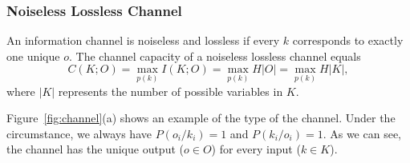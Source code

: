 \subsubsection{Noiseless Lossless Channel}
An information channel is noiseless and lossless if every $k$ corresponds to exactly one unique $o$. The channel capacity of a noiseless lossless channel equals
\begin{equation} \label{chapter5:eq4}
  C(K;O) = \max_{p(k)} I(K;O) = \max_{p(k)} H|O| =\max_{p(k)} H|K|,
\end{equation}
\noindent where $|K|$ represents the number of possible variables in $K$. 

Figure~\ref{fig:channel}(a) shows an example of the type of the channel. Under the circumstance, we always have $P(o_i/k_i) = 1$ and $P(k_i/o_i) = 1$. As we can see, the channel has the unique output ($o \in O$) for every input ($k \in K$).

